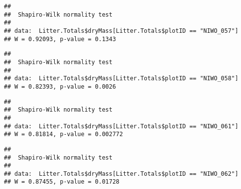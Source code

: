 \documentclass[
]{article}
\newenvironment{Shaded}{\begin{snugshade}}{\end{snugshade}}
\newcommand{\KeywordTok}[1]{\textcolor[rgb]{0.13,0.29,0.53}{\textbf{#1}}}
\newcommand{\NormalTok}[1]{#1}
\newcommand{\OperatorTok}[1]{\textcolor[rgb]{0.81,0.36,0.00}{\textbf{#1}}}
\newcommand{\StringTok}[1]{\textcolor[rgb]{0.31,0.60,0.02}{#1}}
\begin{document}
\begin{verbatim}
## 
##  Shapiro-Wilk normality test
## 
## data:  Litter.Totals$dryMass[Litter.Totals$plotID == "NIWO_057"]
## W = 0.92093, p-value = 0.1343
\end{verbatim}

\begin{Shaded}
\end{Shaded}

\begin{verbatim}
## 
##  Shapiro-Wilk normality test
## 
## data:  Litter.Totals$dryMass[Litter.Totals$plotID == "NIWO_058"]
## W = 0.82393, p-value = 0.0026
\end{verbatim}

\begin{Shaded}
\end{Shaded}

\begin{verbatim}
## 
##  Shapiro-Wilk normality test
## 
## data:  Litter.Totals$dryMass[Litter.Totals$plotID == "NIWO_061"]
## W = 0.81814, p-value = 0.002772
\end{verbatim}

\begin{Shaded}
\end{Shaded}

\begin{verbatim}
## 
##  Shapiro-Wilk normality test
## 
## data:  Litter.Totals$dryMass[Litter.Totals$plotID == "NIWO_062"]
## W = 0.87455, p-value = 0.01728
\end{verbatim}

\begin{Shaded}
\end{Shaded}
\end{document}
